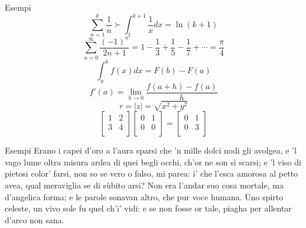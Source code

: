 \documentclass{beamer}
\begin{document}
\begin{frame}{Esempi}
\begin{equation}
\sum_{n=1}^k \frac{1}{n} ≻ \int_1^{k+1} \frac{1}{x} dx = \ln(k+1)
\end{equation}
\begin{equation}
\sum_{n = 0}^\infty \frac{(-1)^{n}}{2n+1} = 1 - \frac{1}{3} + \frac{1}{5} - \frac{1}{7} + \cdots = \frac{\pi}{4}
\end{equation}
\begin{equation}
\int_a^b \! f(x) dx = F(b) - F(a)
\end{equation}
\begin{equation}
f'(a)=\lim_{h\to 0}\frac{f(a+h)-f(a)}{h}
\end{equation}
\begin{equation}
\textstyle r=|z|=\sqrt{x^2+y^2}
\end{equation}
\begin{equation}
\begin{bmatrix} 1 & 2\\ 3 & 4\\ \end{bmatrix} \begin{bmatrix} 0 & 1\\ 0 & 0\\ \end{bmatrix}= \begin{bmatrix} 0 & 1\\ 0 & 3\\ \end{bmatrix}
\end{equation}
\end{frame}

\begin{frame}{Esempi}
\shapepar{\heartshape}
Erano i capei d’oro a l’aura sparsi che ’n mille dolci nodi gli avolgea, e ’l vago lume oltra misura ardea di quei begli occhi, ch’or ne son sì scarsi; e ’l viso di pietosi color’ farsi, non so se vero o falso, mi parea: i’ che l’esca amorosa al petto avea,
qual meraviglia se di sùbito arsi? Non era l’andar suo cosa mortale, ma d’angelica forma; e le parole sonavan altro, che pur voce humana.
Uno spirto celeste, un vivo sole fu quel ch’i' vidi: e se non fosse or tale, piagha per allentar d’arco non sana.
\end{frame}
\end{document}
